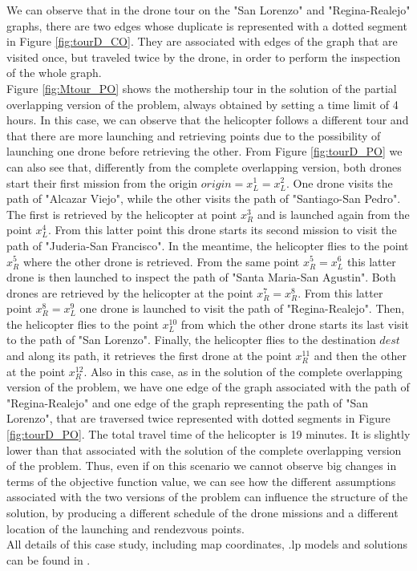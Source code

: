 \documentclass[10pt,a4paper]{elsarticle}
\newcommand{\EN}[1]{{\color{black}#1}}
\begin{document}
We can observe that in the drone tour on \EN{the} "San Lorenzo" and "Regina-Realejo" graphs, there are two edges whose duplicate is represented with a dotted segment in Figure \ref{fig:tourD_CO}. They are associated with edges of the graph that are visited once, but traveled twice by the drone, in order to perform the inspection of the whole graph.\\
Figure \ref{fig:Mtour_PO} shows the mothership tour in the solution of the partial overlapping version of the problem, always obtained by setting a time limit of 4 hours. In this case, we can observe that the helicopter follows a different tour and that there are more launching and retrieving points due to the possibility of launching \EN{one} drone before retrieving the other. From Figure \ref{fig:tourD_PO} we can also see that, differently from the complete overlapping version, both drones start their first mission from the origin $origin=x_L^1=x_L^2$. One drone visits the path of "Alcazar Viejo", while the other visits the path of "Santiago-San Pedro". The first is retrieved by the helicopter at point $x_R^3$ and is launched again from the point $x_L^4$. From this latter point this drone starts its second mission to visit the path of "Juderia-San Francisco". In the meantime, the helicopter flies to the point $x_R^5$ where the other drone is retrieved. From the same point $x_R^5=x_L^6$ this latter drone is then launched to inspect the path of "Santa Maria-San Agustin". Both drones are retrieved by the helicopter at the point $x_R^7=x_R^8$. From this latter point $x_R^8=x_L^9$ one drone is launched to visit the path of "Regina-Realejo". Then, the helicopter flies to the point $x_L^{10}$ from \EN{which} the other drone starts its last visit to the path of "San Lorenzo". Finally, the helicopter flies to the destination $dest$ and along its path, it retrieves the first drone at the point $x_R^{11}$ and then the other at the point $x_R^{12}$. Also in this case, \EN{as} in the solution of the complete overlapping version of the problem, we have one edge of the graph associated with the path of "Regina-Realejo" and one edge of the graph representing the path of "San Lorenzo", that are traversed twice represented with dotted segments in Figure \ref{fig:tourD_PO}. The total travel time of the helicopter is 19 minutes. It is slightly lower than \EN{that} associated with the solution of the complete overlapping version of the problem. Thus, even if on this scenario we cannot observe big changes in terms of the objective function value, we can see how the different assumptions associated with the two versions of the problem can influence the structure of the solution, by producing a different schedule of the drone missions and a different location of the launching and rendezvous points.\\
\noindent
All details of this case study, including map coordinates, .lp models and solutions can be found in \cite{Puerto2021}.
\end{document}
